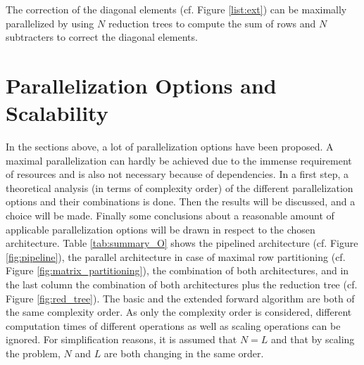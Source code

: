 \documentclass[mscthesis]{usiinfthesis}
\begin{document}
The correction of the diagonal elements (cf. Figure \ref{list:ext}) can be
maximally parallelized by using $N$ reduction trees to compute the sum of rows
and $N$ subtracters to correct the diagonal elements.

\section{Parallelization Options and Scalability}
\label{ch:analysis_all}

In the sections above, a lot of parallelization options have been proposed.
A maximal parallelization can hardly be achieved due to the immense requirement
of resources and is also not necessary because of dependencies. In a first
step, a theoretical analysis (in terms of complexity order) of the different
parallelization options and their combinations is done. Then the results will
be discussed, and a choice will be made. Finally some conclusions about
a reasonable amount of applicable parallelization options will be drawn in
respect to the chosen architecture. Table \ref{tab:summary_O} shows the
pipelined architecture (cf. Figure \ref{fig:pipeline}), the parallel
architecture in case of maximal row partitioning (cf. Figure
\ref{fig:matrix_partitioning}), the combination of both architectures, and in
the last column the combination of both architectures plus the reduction tree
(cf. Figure \ref{fig:red_tree}). The basic and the extended forward algorithm
are both of the same complexity order. As only the complexity order is
considered, different computation times of different operations as well as
scaling operations can be ignored. For simplification reasons, it is assumed that
$N=L$ and that by scaling the problem, $N$ and $L$ are both changing in the
same order.
\end{document}
